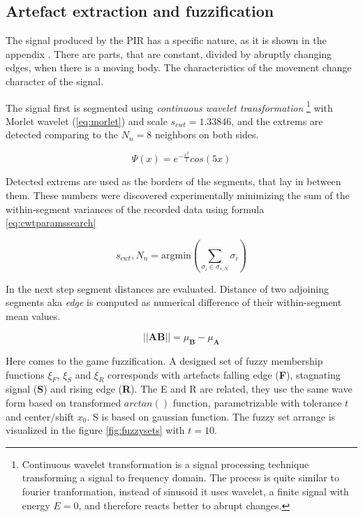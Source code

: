 \subsection*{Artefact extraction and fuzzification}
The signal produced by the PIR has a specific nature, as it is shown in the appendix \label{appendix:PIRSignal}.
There are parts, that are constant, divided by abruptly changing edges, when there is a moving body. The
characteristics of the movement change character of the signal.

The signal first is segmented using {\it continuous wavelet transformation}
\footnote{Continuous wavelet transformation is a signal processing technique transforming a
signal to frequency domain. The process is quite similar to fourier tranformation, instead
of sinusoid it uses wavelet, a finite signal with energy $E=0$, and therefore reacts better
to abrupt changes.\cite{WaveletTour}}
with Morlet wavelet (\ref{eq:morlet}) and scale $s_{cwt} = 1.33846$, and the extrems are
detected comparing to the $N_{n} = 8$ neighbors on both sides.

\begin{equation}
\Psi(x) = e^{-\frac{x^2}{2}} cos(5x)
\label{eq:morlet}
\end{equation}


Detected extrems are used as the borders of the segments, that lay in between them. These numbers were
discovered experimentally minimizing the sum of the within-segment variances of the recorded data using
formula \ref{eq:cwtparamssearch}

\begin{equation}
s_{cwt}, N_{n} = \text{argmin} ( \sum_{\sigma_i \in \sigma_{s,N}} \sigma_i )
\label{eq:cwtparamssearch}
\end{equation}


In the next step segment distances are evaluated. Distance of two adjoining segments aka {\it edge} is computed as numerical
difference of their within-segment mean values.

\begin{equation}
||\textbf{AB}|| = \mu_\textbf{B} - \mu_\textbf{A}
\end{equation}


Here comes to the game fuzzification. A designed set of fuzzy membership functions $\xi_F$, $\xi_S$ and $\xi_R$
corresponds with artefacts falling edge (\textbf{F}), stagnating signal (\textbf{S}) and rising edge (\textbf{R}).
The E and R are related, they use the same wave form based on transformed $arctan()$ function, parametrizable with
tolerance $t$ and center/shift $x_0$. S is based on gaussian function. The fuzzy set arrange is visualized
in the figure \ref{fig:fuzzysets} with $t=10$.

